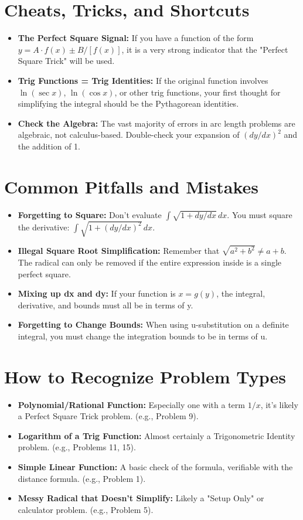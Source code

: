 \documentclass{article}
\begin{document}
\section*{Cheats, Tricks, and Shortcuts}
\begin{itemize}
    \item \textbf{The Perfect Square Signal:} If you have a function of the form $y = A \cdot f(x) \pm B/[f(x)]$, it is a very strong indicator that the "Perfect Square Trick" will be used.
    \item \textbf{Trig Functions = Trig Identities:} If the original function involves $\ln(\sec x)$, $\ln(\cos x)$, or other trig functions, your first thought for simplifying the integral should be the Pythagorean identities.
    \item \textbf{Check the Algebra:} The vast majority of errors in arc length problems are algebraic, not calculus-based. Double-check your expansion of $(dy/dx)^2$ and the addition of 1.
\end{itemize}

\section*{Common Pitfalls and Mistakes}
\begin{itemize}
    \item \textbf{Forgetting to Square:} Don't evaluate $\int\sqrt{1 + dy/dx} \,dx$. You must square the derivative: $\int\sqrt{1 + (dy/dx)^2} \,dx$.
    \item \textbf{Illegal Square Root Simplification:} Remember that $\sqrt{a^2 + b^2} \neq a + b$. The radical can only be removed if the entire expression inside is a single perfect square.
    \item \textbf{Mixing up dx and dy:} If your function is $x = g(y)$, the integral, derivative, and bounds must all be in terms of y.
    \item \textbf{Forgetting to Change Bounds:} When using u-substitution on a definite integral, you must change the integration bounds to be in terms of u.
\end{itemize}

\section*{How to Recognize Problem Types}
\begin{itemize}
    \item \textbf{Polynomial/Rational Function:} Especially one with a term $1/x$, it's likely a Perfect Square Trick problem. (e.g., Problem 9).
    \item \textbf{Logarithm of a Trig Function:} Almost certainly a Trigonometric Identity problem. (e.g., Problems 11, 15).
    \item \textbf{Simple Linear Function:} A basic check of the formula, verifiable with the distance formula. (e.g., Problem 1).
    \item \textbf{Messy Radical that Doesn't Simplify:} Likely a "Setup Only" or calculator problem. (e.g., Problem 5).
\end{itemize}
\end{document}
